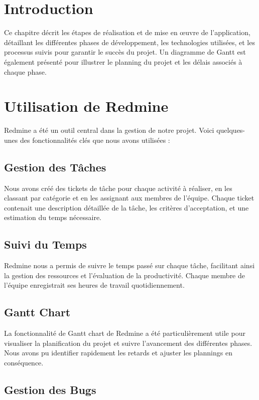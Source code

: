\documentclass[a4paper, 11pt, openany]{report}
\begin{document}
\section{Introduction}
Ce chapitre décrit les étapes de réalisation et de mise en œuvre de l'application, détaillant les différentes phases de développement, les technologies utilisées, et les processus suivis pour garantir le succès du projet. Un diagramme de Gantt est également présenté pour illustrer le planning du projet et les délais associés à chaque phase.


\section{Utilisation de Redmine}

Redmine a été un outil central dans la gestion de notre projet. Voici quelques-unes des fonctionnalités clés que nous avons utilisées :

\subsection{Gestion des Tâches}

Nous avons créé des tickets de tâche pour chaque activité à réaliser, en les classant par catégorie et en les assignant aux membres de l'équipe. Chaque ticket contenait une description détaillée de la tâche, les critères d'acceptation, et une estimation du temps nécessaire.

\subsection{Suivi du Temps}

Redmine nous a permis de suivre le temps passé sur chaque tâche, facilitant ainsi la gestion des ressources et l'évaluation de la productivité. Chaque membre de l'équipe enregistrait ses heures de travail quotidiennement.

\subsection{Gantt Chart}

La fonctionnalité de Gantt chart de Redmine a été particulièrement utile pour visualiser la planification du projet et suivre l'avancement des différentes phases. Nous avons pu identifier rapidement les retards et ajuster les plannings en conséquence.

\subsection{Gestion des Bugs}
\end{document}
